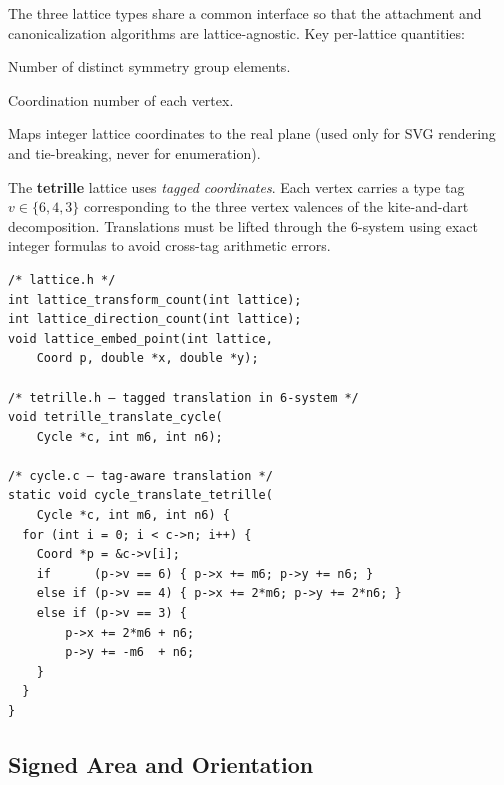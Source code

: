 \documentclass[10pt,a4paper]{article}
\let\polysubsection\subsection
\renewcommand\subsection{\needspace{0.12\textheight}\polysubsection}
\newcommand{\file}[1]{\texttt{\footnotesize #1}}
\begin{document}
\begin{tcolorbox}[dualbox, title={Lattice Abstraction --- \file{src/core/lattice.h}, \file{tetrille.h}}]
  The three lattice types share a common interface so that the
  attachment and canonicalization algorithms are lattice-agnostic.
  Key per-lattice quantities:

  \begin{description}[leftmargin=0pt]
    \item[Transform count] Number of distinct symmetry group elements.
    \item[Direction count] Coordination number of each vertex.
    \item[Embed point] Maps integer lattice coordinates to the real
      plane (used only for SVG rendering and tie-breaking, never for
      enumeration).
  \end{description}

  The \textbf{tetrille} lattice uses \emph{tagged coordinates}.
  Each vertex carries a type tag $v \in \{6, 4, 3\}$
  corresponding to the three vertex valences of the kite-and-dart
  decomposition.  Translations must be lifted through the 6-system
  using exact integer formulas to avoid cross-tag arithmetic errors.
\tcblower
\begin{verbatim}
/* lattice.h */
int lattice_transform_count(int lattice);
int lattice_direction_count(int lattice);
void lattice_embed_point(int lattice,
    Coord p, double *x, double *y);

/* tetrille.h — tagged translation in 6-system */
void tetrille_translate_cycle(
    Cycle *c, int m6, int n6);

/* cycle.c — tag-aware translation */
static void cycle_translate_tetrille(
    Cycle *c, int m6, int n6) {
  for (int i = 0; i < c->n; i++) {
    Coord *p = &c->v[i];
    if      (p->v == 6) { p->x += m6; p->y += n6; }
    else if (p->v == 4) { p->x += 2*m6; p->y += 2*n6; }
    else if (p->v == 3) {
        p->x += 2*m6 + n6;
        p->y += -m6  + n6;
    }
  }
}
\end{verbatim}
\end{tcolorbox}

\subsection{Signed Area and Orientation}
\end{document}
